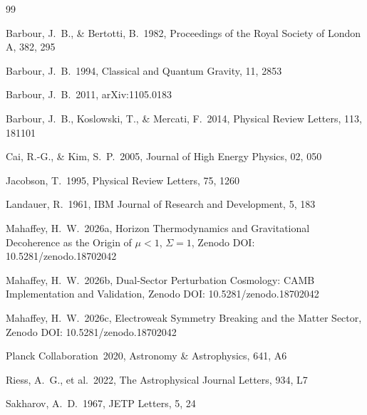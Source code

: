 \documentclass[12pt,a4paper]{article}
\begin{document}

\begin{thebibliography}{99}

Barbour, J.~B., \& Bertotti, B.\ 1982, Proceedings of the Royal Society
of London A, 382, 295

Barbour, J.~B.\ 1994, Classical and Quantum Gravity, 11, 2853

Barbour, J.~B.\ 2011, arXiv:1105.0183

Barbour, J.~B., Koslowski, T., \& Mercati, F.\ 2014, Physical Review
Letters, 113, 181101

Cai, R.-G., \& Kim, S.~P.\ 2005, Journal of High Energy Physics, 02, 050

Jacobson, T.\ 1995, Physical Review Letters, 75, 1260

Landauer, R.\ 1961, IBM Journal of Research and Development, 5, 183

Mahaffey, H.~W.\ 2026a, Horizon Thermodynamics and Gravitational
Decoherence as the Origin of $\mu < 1$, $\Sigma = 1$,
Zenodo DOI: 10.5281/zenodo.18702042

Mahaffey, H.~W.\ 2026b, Dual-Sector Perturbation Cosmology: CAMB
Implementation and Validation, Zenodo DOI: 10.5281/zenodo.18702042

Mahaffey, H.~W.\ 2026c, Electroweak Symmetry Breaking and the Matter Sector,
Zenodo DOI: 10.5281/zenodo.18702042

Planck Collaboration\ 2020, Astronomy \& Astrophysics, 641, A6

Riess, A.~G., et al.\ 2022, The Astrophysical Journal Letters, 934, L7

Sakharov, A.~D.\ 1967, JETP Letters, 5, 24

\end{thebibliography}
\end{document}
